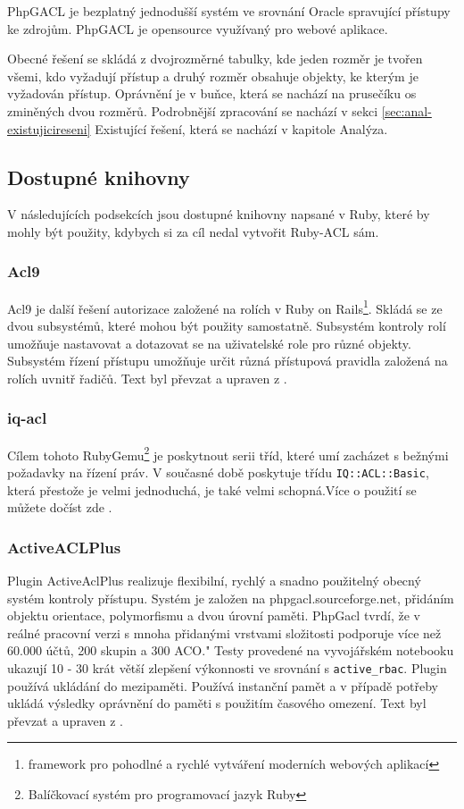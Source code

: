 PhpGACL je bezplatný jednodušší systém ve srovnání Oracle spravující přístupy ke zdrojům. PhpGACL je opensource využívaný pro webové aplikace.

Obecné řešení se skládá z dvojrozměrné tabulky, kde jeden rozměr je tvořen všemi, kdo vyžadují přístup a druhý rozměr obsahuje objekty, ke kterým je vyžadován přístup. Oprávnění je v buňce, která se nachází na prusečíku os zminěných dvou rozměrů.
Podrobnější zpracování se nachází v sekci \ref{sec:anal-existujicireseni} Existující řešení, která se nachází v kapitole Analýza.

\subsection{Dostupné knihovny}
V následujících podsekcích jsou dostupné knihovny napsané v Ruby, které by mohly být použity, kdybych si za cíl nedal vytvořit Ruby-ACL sám.

\subsubsection{Acl9}
Acl9 je další řešení autorizace založené na rolích v Ruby on Rails\footnote{framework pro pohodlné a rychlé vytváření moderních webových aplikací}. Skládá se ze dvou subsystémů, které mohou být použity samostatně. Subsystém kontroly rolí umožňuje nastavovat a dotazovat se na uživatelské role pro různé objekty. 
Subsystém řízení přístupu umožňuje určit různá přístupová pravidla založená na rolích uvnitř řadičů. Text byl převzat a upraven z \cite{github:acl9}.

\subsubsection{iq-acl}
Cílem tohoto RubyGemu\footnote{Balíčkovací systém pro programovací jazyk Ruby} je poskytnout serii tříd, které umí zacházet s bežnými požadavky na řízení práv. V současné době poskytuje třídu \verb|IQ::ACL::Basic|, která přestože je velmi jednoduchá, je také velmi schopná.Více o použití se můžete dočíst zde \cite{github:iq-acl}.

\subsubsection{ActiveACLPlus}
Plugin ActiveAclPlus realizuje flexibilní, rychlý a snadno použitelný obecný systém kontroly přístupu.
Systém je založen na phpgacl.sourceforge.net, přidáním objektu orientace, polymorfismu a dvou úrovní paměti. PhpGacl tvrdí, že v reálné pracovní verzi s mnoha přidanými vrstvami složitosti podporuje více než 60.000 účtů, 200 skupin a 300 ACO." Testy provedené na vyvojářském notebooku ukazují 10 - 30 krát větší zlepšení výkonnosti ve srovnání s \verb|active_rbac|.
Plugin používá ukládání do mezipaměti. Používá instanční pamět a v případě potřeby ukládá výsledky oprávnění do paměti s použitím časového omezení. Text byl převzat a upraven z \cite{rubyforge:ActiveAclPlus}.